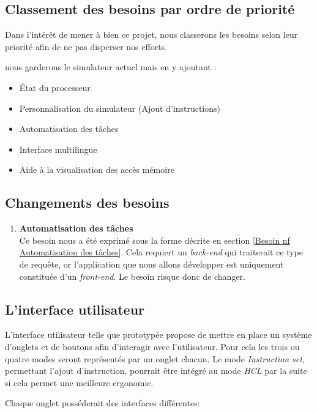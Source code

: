\documentclass[french]{article}
\newcommand{\itembf}[1]{\item \textbf{#1}\\}
\begin{document}
\subsection{Classement des besoins par ordre de priorité}
Dans l'intérêt de mener à bien ce projet, nous classerons les besoins selon leur priorité afin de ne pas disperser nos efforts. 

nous garderons le simulateur actuel mais en y ajoutant :
\begin{itemize}
    \item État du processeur
    \item Personnalisation du simulateur (Ajout d'instructions)
    \item Automatisation des tâches
    \item Interface multilingue
    \item Aide à la visualisation des accès mémoire
\end{itemize}


\subsection{Changements des besoins}\label{Changements des besoins}
\begin{enumerate}
    \itembf{Automatisation des tâches}
    Ce besoin nous a été exprimé sous la forme décrite en section \ref{Besoin nf Automatisation des tâches}. Cela requiert un \textit{back-end} qui traiterait ce type de requête, or l'application que nous allons développer est uniquement constituée d'un \textit{front-end}. Le besoin risque donc de changer.
\end{enumerate}
    
\subsection{L'interface utilisateur}

L'interface utilisateur telle que prototypée propose de mettre en place un système d'onglets et de boutons afin d'interagir avec l'utilisateur. Pour cela les trois ou quatre modes seront représentés par un onglet chacun. Le mode \textit{Instruction set}, permettant l'ajout d'instruction, pourrait être intégré au mode \textit{HCL} par la suite si cela permet une meilleure ergonomie. 

Chaque onglet posséderait des interfaces différentes: 
\end{document}

